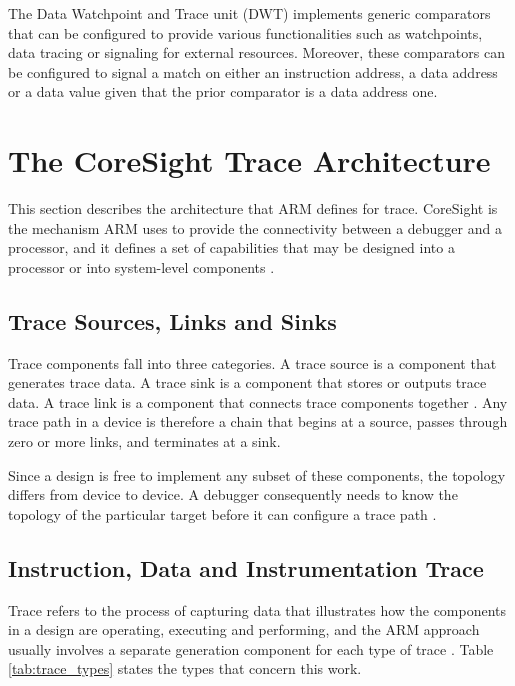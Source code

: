 The Data Watchpoint and Trace unit (DWT) implements generic comparators that can be configured to provide various functionalities such as watchpoints, data tracing or signaling for external resources. Moreover, these comparators can be configured to signal a match on either an instruction address, a data address or a data value given that the prior comparator is a data address one.

\section{The CoreSight Trace Architecture}
\label{sec:coresight}
This section describes the architecture that ARM defines for trace. CoreSight is the mechanism ARM uses to provide the connectivity between a debugger and a processor, and it defines a set of capabilities that may be designed into a processor or into system-level components \cite{coresight_guide}.

\subsection{Trace Sources, Links and Sinks}
\label{subsec:sls}
Trace components fall into three categories. A trace source is a component that generates trace data. A trace sink is a component that stores or outputs trace data. A trace link is a component that connects trace components together \cite{understanding_trace}. Any trace path in a device is therefore a chain that begins at a source, passes through zero or more links, and terminates at a sink.

Since a design is free to implement any subset of these components, the topology differs from device to device. A debugger consequently needs to know the topology of the particular target before it can configure a trace path \cite{understanding_trace}.

\subsection{Instruction, Data and Instrumentation Trace}
Trace refers to the process of capturing data that illustrates how the components in a design are operating, executing and performing, and the ARM approach usually involves a separate generation component for each type of trace \cite{understanding_trace}. Table \ref{tab:trace_types} states the types that concern this work.

